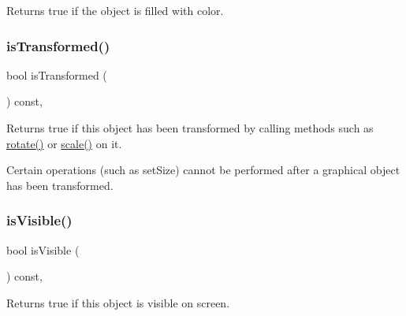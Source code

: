 Returns {\ttfamily true} if the object is filled with color. 

\mbox{\label{classsgl_1_1GObject_a9de207581cfa4ca1eaa06da5f29b75fc}} 
\subsubsection{\texorpdfstring{is\+Transformed()}{isTransformed()}}
{\footnotesize\ttfamily bool is\+Transformed (\begin{DoxyParamCaption}{ }\end{DoxyParamCaption}) const\hspace{0.3cm}{\ttfamily [virtual]}, {\ttfamily [inherited]}}



Returns {\ttfamily true} if this object has been transformed by calling methods such as \mbox{\hyperlink{classsgl_1_1GObject_ae1ffaa12185dfd5ba464f7d87c329e26}{rotate()}} or \mbox{\hyperlink{classsgl_1_1GObject_ad2e1900f730475c2d044817db03b38d6}{scale()}} on it. 

Certain operations (such as set\+Size) cannot be performed after a graphical object has been transformed. \mbox{\label{classsgl_1_1GObject_a9d8a6cfb13917785c143e74d40e4e2be}} 
\subsubsection{\texorpdfstring{is\+Visible()}{isVisible()}}
{\footnotesize\ttfamily bool is\+Visible (\begin{DoxyParamCaption}{ }\end{DoxyParamCaption}) const\hspace{0.3cm}{\ttfamily [virtual]}, {\ttfamily [inherited]}}



Returns {\ttfamily true} if this object is visible on screen. 

\mbox{\label{classsgl_1_1GObject_a5973d8dda83afb36e2c56855515be392}} 
